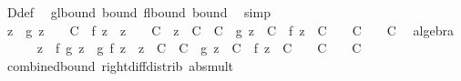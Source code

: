 \begin{isabellebody}
\ D{\isacharunderscore}{\kern0pt}def\ \isamarkupfalse%
\ g{\isacharunderscore}{\kern0pt}lbound\ bound\ f{\isacharunderscore}{\kern0pt}lbound\ bound{\isacharprime}{\kern0pt}\ \isamarkupfalse%
\ simp\isanewline
\isanewline
\ \ \ \ \isamarkupfalse%
\ {\isachardoublequoteopen}{\isacharparenleft}{\kern0pt}{\isasymbar}z{\isasymbar}\ {\isacharplus}{\kern0pt}\ {\isasymbar}g\ z{\isasymbar}\ {\isacharplus}{\kern0pt}\ {}{\isacharparenright}{\kern0pt}\ {\isacharasterisk}{\kern0pt}\ C\ {\isacharplus}{\kern0pt}\ {\isacharparenleft}{\kern0pt}{\isasymbar}f\ z{\isasymbar}\ {\isacharplus}{\kern0pt}\ {\isasymbar}z{\isasymbar}\ {\isacharplus}{\kern0pt}\ {}{\isacharparenright}{\kern0pt}\ {\isacharasterisk}{\kern0pt}\ C{\isacharprime}{\kern0pt}\ {\isacharequal}{\kern0pt}\ {\isasymbar}z{\isasymbar}\ {\isacharasterisk}{\kern0pt}\ {\isacharparenleft}{\kern0pt}C\ {\isacharplus}{\kern0pt}\ C{\isacharprime}{\kern0pt}{\isacharparenright}{\kern0pt}\ {\isacharplus}{\kern0pt}\ {\isasymbar}g\ z{\isasymbar}\ {\isacharasterisk}{\kern0pt}\ C\ {\isacharplus}{\kern0pt}\ {\isasymbar}f\ z{\isasymbar}\ {\isacharasterisk}{\kern0pt}\ C{\isacharprime}{\kern0pt}\ {\isacharplus}{\kern0pt}\ {}\ {\isacharasterisk}{\kern0pt}\ C\ {\isacharplus}{\kern0pt}\ {}\ {\isacharasterisk}{\kern0pt}\ C{\isacharprime}{\kern0pt}{\isachardoublequoteclose}\ \isamarkupfalse%
\ algebra\isanewline
\ \ \ \ \isamarkupfalse%
\ {\isachardoublequoteopen}{\isasymbar}z{\isasymbar}\ {\isacharasterisk}{\kern0pt}\ {\isasymbar}f\ {\isacharparenleft}{\kern0pt}g\ z{\isacharparenright}{\kern0pt}\ {\isacharminus}{\kern0pt}\ g\ {\isacharparenleft}{\kern0pt}f\ z{\isacharparenright}{\kern0pt}{\isasymbar}\ {\isasymle}\ {\isasymbar}z{\isasymbar}\ {\isacharasterisk}{\kern0pt}\ {\isacharparenleft}{\kern0pt}C\ {\isacharplus}{\kern0pt}\ C{\isacharprime}{\kern0pt}{\isacharparenright}{\kern0pt}\ {\isacharplus}{\kern0pt}\ {\isasymbar}g\ z{\isasymbar}\ {\isacharasterisk}{\kern0pt}\ C\ {\isacharplus}{\kern0pt}\ {\isasymbar}f\ z{\isasymbar}\ {\isacharasterisk}{\kern0pt}\ C{\isacharprime}{\kern0pt}\ {\isacharplus}{\kern0pt}\ {}\ {\isacharasterisk}{\kern0pt}\ C\ {\isacharplus}{\kern0pt}\ {}\ {\isacharasterisk}{\kern0pt}\ C{\isacharprime}{\kern0pt}{\isachardoublequoteclose}\ \isamarkupfalse%
\ combined{\isacharunderscore}{\kern0pt}bound\ right{\isacharunderscore}{\kern0pt}diff{\isacharunderscore}{\kern0pt}distrib\ abs{\isacharunderscore}{\kern0pt}mult\ \isamarkupfalse%

\end{isabellebody}
